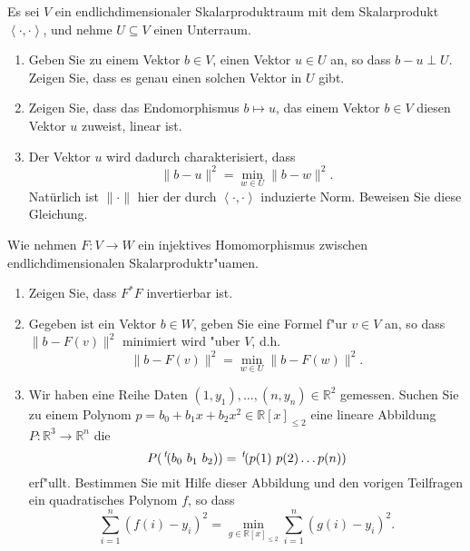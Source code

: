 \documentclass[a4,11pt]{article}
\begin{document}
\vspace*{-17mm}
{
\kopf
}



\begin{aufgabe}[4 Punkte]
Es sei $V$ ein endlichdimensionaler Skalarproduktraum mit dem Skalarprodukt $\left<\cdot , \cdot \right>$, und nehme $U \subseteq V$ einen Unterraum.
  
  \begin{enumerate}
  \item Geben Sie zu einem Vektor $b \in V$, einen Vektor $u \in U$ an, so dass  $b-u \perp U$. Zeigen Sie, dass es genau einen solchen Vektor in $U$ gibt.
  \item Zeigen Sie, dass das Endomorphismus $b \mapsto u$, das einem Vektor $b \in V$ diesen Vektor $u$ zuweist, linear ist.
  \item Der Vektor $u$ wird dadurch charakterisiert, dass 
  \[
  \| b - u \|^2 = \min_{w\in U} \| b - w \|^2.
  \]
  Natürlich ist $\| \cdot \|$ hier der durch $\left<\cdot , \cdot \right>$ induzierte Norm. Beweisen Sie diese Gleichung.
\end{enumerate}
\end{aufgabe}

\begin{aufgabe}[4 Punkte]
  Wie nehmen $F \colon V \to W$ ein injektives Homomorphismus zwischen endlichdimensionalen Skalarproduktr"uamen.
  \begin{enumerate}
  \item Zeigen Sie, dass $F^*F$ invertierbar ist.
  \item Gegeben ist ein Vektor $b \in W$, geben Sie eine Formel f"ur $v \in V$ an, so dass $\| b - F(v) \|^2$ minimiert wird "uber $V$, d.h.
  \[
  \| b - F(v) \|^2 = \min_{w\in U} \| b - F(w) \|^2.
  \]
  \item Wir haben eine Reihe Daten $(1,y_1), \ldots, (n,y_n) \in \mathbb{R}^2$ gemessen. Suchen Sie zu einem Polynom $p = b_0 + b_1 x + b_2 x^2\in \mathbb{R} [x]_{\leq 2}$ eine lineare Abbildung $P : \mathbb{R}^3 \rightarrow \mathbb{R}^n$ die
  \[
  P(\,^t\!(b_0 \ b_1 \ b_2)) = \,^t\!(p(1) \ p(2) \dots p(n))
  \]
  erf"ullt.
   Bestimmen Sie mit Hilfe dieser Abbildung und den vorigen Teilfragen ein quadratisches Polynom $f$, so dass
  \[
  \sum_{i = 1}^n (f(i)-y_i)^2 = \min_{g \in \mathbb{R} [x]_{\leq 2}} \sum_{i = 1}^n (g(i)-y_i)^2 .
  \]
  \end{enumerate}
\end{aufgabe}
\end{document}
